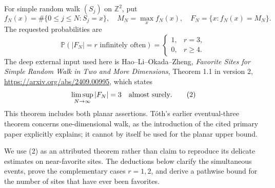 For simple random walk $(S_j)$ on $\mathbb Z^2$, put
\[
 f_N(x)=\#\{0\le j\le N:S_j=x\},\quad
 M_N=\max_x f_N(x),\quad F_N=\{x:f_N(x)=M_N\}.
\]
The requested probabilities are
\[
 \mathbb P(|F_N|=r\text{ infinitely often})=
 \begin{cases}1,&r=3,\\0,&r\ge4.\end{cases}\tag{1}
\]
The deep external input used here is Hao--Li--Okada--Zheng, \emph{Favorite Sites for Simple Random Walk in Two and More Dimensions}, Theorem 1.1 in version 2, \url{https://arxiv.org/abs/2409.00995}, which states
\[
 \limsup_{N\to\infty}|F_N|=3\quad\hbox{almost surely}.\tag{2}
\]
This theorem includes both planar assertions. T\'oth's earlier eventual-three theorem concerns one-dimensional walk, as the introduction of the cited primary paper explicitly explains; it cannot by itself be used for the planar upper bound.

We use (2) as an attributed theorem rather than claim to reproduce its delicate estimates on near-favorite sites. The deductions below clarify the simultaneous events, prove the complementary cases $r=1,2$, and derive a pathwise bound for the number of sites that have ever been favorites.
